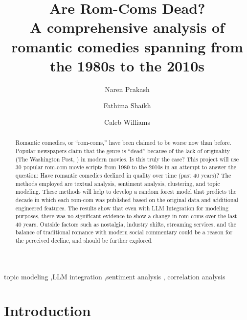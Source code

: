 \documentclass[
  authoryear,
  preprint]{elsarticle}
\begin{document}
\begin{frontmatter}
\title{Are Rom-Coms Dead? \\\large{A comprehensive analysis of romantic
comedies spanning from the 1980s to the 2010s} }
\author[1]{Naren Prakash%
%
}

\author[1]{Fathima Shaikh%
%
}

\author[1]{Caleb Williams%
%
}






        
\begin{abstract}
Romantic comedies, or ``rom-coms,'' have been claimed to be worse now
than before. Popular newspapers claim that the genre is ``dead'' because
of the lack of originality (The Washington Post, \citet{romcomdead}) in
modern movies. Is this truly the case? This project will use 30 popular
rom-com movie scripts from 1980 to the 2010s in an attempt to answer the
question: Have romantic comedies declined in quality over time (past 40
years)? The methods employed are textual analysis, sentiment analysis,
clustering, and topic modeling. These methods will help to develop a
random forest model that predicts the decade in which each rom-com was
published based on the original data and additional engineered features.
The results show that even with LLM Integration for modeling purposes,
there was no significant evidence to show a change in rom-coms over the
last 40 years. Outside factors such as nostalgia, industry shifts,
streaming services, and the balance of traditional romance with modern
social commentary could be a reason for the perceived decline, and
should be further explored.
\end{abstract}





\begin{keyword}
    topic modeling \sep LLM integration \sep sentiment analysis \sep 
    correlation analysis
\end{keyword}
\end{frontmatter}
    

\section{Introduction}\label{introduction}
\end{document}
